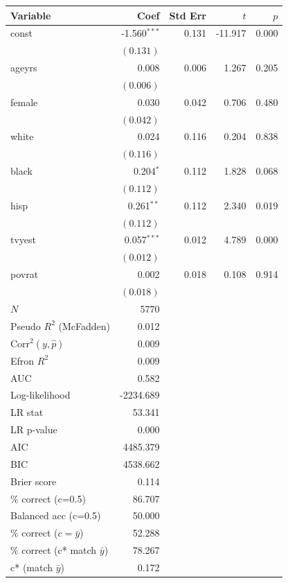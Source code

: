 \documentclass{article}
\begin{document}
\renewcommand{\arraystretch}{1.1}
\setlength{\tabcolsep}{6pt}
\begin{table}[H]
\centering
\begin{tabular}{lrrrr}
\hline
Variable & Coef & Std Err & $t$ & $p$ \\
\hline
const & -1.560$^{\ast\ast\ast}$ & 0.131 & -11.917 & 0.000 \\
 & $(0.131)$ & & & \\
ageyrs & 0.008 & 0.006 & 1.267 & 0.205 \\
 & $(0.006)$ & & & \\
female & 0.030 & 0.042 & 0.706 & 0.480 \\
 & $(0.042)$ & & & \\
white & 0.024 & 0.116 & 0.204 & 0.838 \\
 & $(0.116)$ & & & \\
black & 0.204$^{\ast}$ & 0.112 & 1.828 & 0.068 \\
 & $(0.112)$ & & & \\
hisp & 0.261$^{\ast\ast}$ & 0.112 & 2.340 & 0.019 \\
 & $(0.112)$ & & & \\
tvyest & 0.057$^{\ast\ast\ast}$ & 0.012 & 4.789 & 0.000 \\
 & $(0.012)$ & & & \\
povrat & 0.002 & 0.018 & 0.108 & 0.914 \\
 & $(0.018)$ & & & \\
\hline
$N$ & 5770 & & & \\
Pseudo $R^2$ (McFadden) & 0.012 & & & \\
Corr$^2(y,\hat p)$ & 0.009 & & & \\
Efron $R^2$ & 0.009 & & & \\
AUC & 0.582 & & & \\
Log-likelihood & -2234.689 & & & \\
LR stat & 53.341 & & & \\
LR p-value & 0.000 & & & \\
AIC & 4485.379 & & & \\
BIC & 4538.662 & & & \\
Brier score & 0.114 & & & \\
\% correct (c=0.5) & 86.707 & & & \\
Balanced acc (c=0.5) & 50.000 & & & \\
\% correct ($c=\bar{y}$) & 52.288 & & & \\
\% correct (c* match $\bar{y}$) & 78.267 & & & \\
c* (match $\bar{y}$) & 0.172 & & & \\
\hline
\end{tabular}
\end{table}
\end{document}
